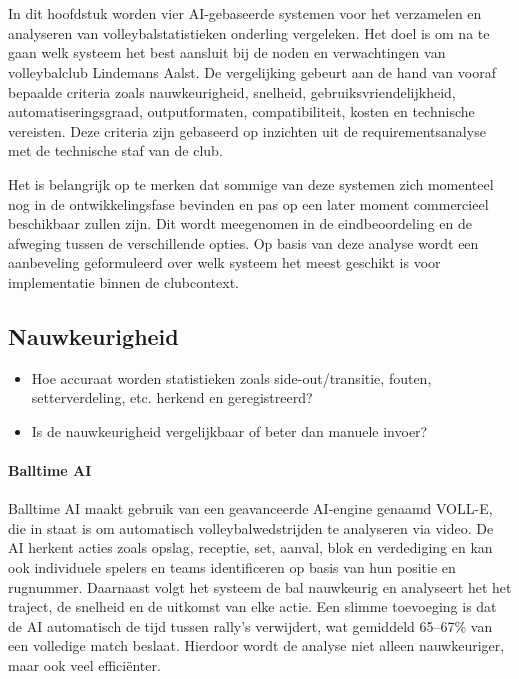 \chapter{}%
\label{ch:vergelijkendestudie}
In dit hoofdstuk worden vier AI-gebaseerde systemen voor het verzamelen en analyseren van volleybalstatistieken onderling vergeleken. Het doel is om na te gaan welk systeem het best aansluit bij de noden en verwachtingen van volleybalclub Lindemans Aalst. De vergelijking gebeurt aan de hand van vooraf bepaalde criteria zoals nauwkeurigheid, snelheid, gebruiksvriendelijkheid, automatiseringsgraad, outputformaten, compatibiliteit, kosten en technische vereisten. Deze criteria zijn gebaseerd op inzichten uit de requirementsanalyse met de technische staf van de club.

Het is belangrijk op te merken dat sommige van deze systemen zich momenteel nog in de ontwikkelingsfase bevinden en pas op een later moment commercieel beschikbaar zullen zijn. Dit wordt meegenomen in de eindbeoordeling en de afweging tussen de verschillende opties. Op basis van deze analyse wordt een aanbeveling geformuleerd over welk systeem het meest geschikt is voor implementatie binnen de clubcontext.

\section{Nauwkeurigheid}
\begin{itemize}
  \item Hoe accuraat worden statistieken zoals side-out/transitie, fouten, setterverdeling, etc. herkend en geregistreerd?
  \item Is de nauwkeurigheid vergelijkbaar of beter dan manuele invoer?
\end{itemize}
\subsubsection{Balltime AI}
Balltime AI maakt gebruik van een geavanceerde AI-engine genaamd VOLL-E, die in staat is om automatisch volleybalwedstrijden te analyseren via video. De AI herkent acties zoals opslag, receptie, set, aanval, blok en verdediging en kan ook individuele spelers en teams identificeren op basis van hun positie en rugnummer. Daarnaast volgt het systeem de bal nauwkeurig en analyseert het het traject, de snelheid en de uitkomst van elke actie. Een slimme toevoeging is dat de AI automatisch de tijd tussen rally's verwijdert, wat gemiddeld 65–67\% van een volledige match beslaat. Hierdoor wordt de analyse niet alleen nauwkeuriger, maar ook veel efficiënter. \autocite{BalltimeAI2025}

